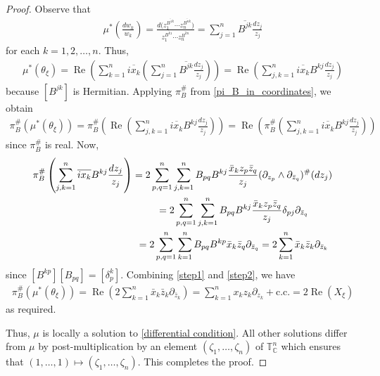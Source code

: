 \documentclass[pdftex]{sigma}
\numberwithin{equation}{section}
\begin{document}
\begin{proof}
Observe that
\begin{gather*}
\mu^*\left(\frac{dw_k}{w_k}\right)=\frac{d\big(z_1^{\overline{B^{1k}}}\cdots z_n^{\overline{B^{nk}}}\big)}{z_1^{\overline{B^{k1}}}\cdots z_n^{\overline{B^{kn}}}}=\sum_{j=1}^n \overline{B^{jk}}\frac{dz_j}{z_{j}}
\end{gather*}
for each $k=1,2,\dots,n$. Thus,
\begin{gather*}
\mu^*(\theta_\xi)=\operatorname{Re}\left(\sum_{k=1}^n \overline{ix_k}\left(\sum_{j=1}^n \overline{B^{jk}}\frac{dz_j}{z_{j}}\right)\right)=\operatorname{Re}\left(\sum_{j,k=1}^n \overline{ix_k}B^{kj}\frac{dz_j}{z_{j}}\right)
\end{gather*}
because $[B^{jk}]$ is Hermitian. Applying $\pi_B^\#$ from \eqref{pi_B_in_coordinates}, we obtain
\begin{gather}
\pi_B^\#(\mu^*(\theta_\xi)) =\pi_B^\#\left(\operatorname{Re}\left(\sum_{j,k=1}^n \overline{ix_k}B^{kj}\frac{dz_j}{z_{j}} \right)\right)
=\operatorname{Re}\left(\pi_B^\#\left(\sum_{j,k=1}^n \overline{ix_k}B^{kj}\frac{dz_j}{z_{j}}\right)\right) \label{step1}
\end{gather}
since $\pi_B^\#$ is real. Now,
\begin{gather}
\pi_B^\#\left(\sum_{j,k=1}^n \overline{ix_k}B^{kj}\frac{dz_j}{z_{j}}\right)=2\sum_{p,q=1}^n \sum_{j,k=1}^n B_{pq}B^{kj}\frac{\bar{x}_k z_p \bar{z}_q}{z_j} (\partial_{z_p}\wedge \partial_{\bar{z}_q})^\#(dz_j) \nonumber \\
\hphantom{\pi_B^\#\left(\sum_{j,k=1}^n \overline{ix_k}B^{kj}\frac{dz_j}{z_{j}}\right)}{}
=2\sum_{p,q=1}^n \sum_{j,k=1}^n B_{pq}B^{kj}\frac{\bar{x}_k z_p \bar{z}_q}{z_j} \delta_{pj}\partial_{\bar{z}_q} \nonumber \\
\hphantom{\pi_B^\#\left(\sum_{j,k=1}^n \overline{ix_k}B^{kj}\frac{dz_j}{z_{j}}\right)}{}
=2\sum_{p,q=1}^n \sum_{k=1}^n B_{pq}B^{k p}\bar{x}_k\bar{z}_q\partial_{\bar{z}_q} =2\sum_{k=1}^n\bar{x}_k\bar{z}_k\partial_{\bar{z}_k} \label{step2}
\end{gather}
since $[B^{kp}][B_{pq}]=[\delta_p^k]$. Combining \eqref{step1} and \eqref{step2}, we have
\begin{gather*}
\pi_B^\#(\mu^*(\theta_\xi)) =\operatorname{Re}\left(2\sum_{k=1}^n\bar{x}_k\bar{z}_k\partial_{\bar{z}_k}\right)=\sum_{k=1}^n x_k z_k\partial_{z_k} +\text{c.c.} = 2\operatorname{Re} (X_\xi)
\end{gather*}
as required.

Thus, $\mu$ is locally a solution to \eqref{differential condition}. All other solutions dif\/fer from $\mu$ by post-multiplication by an element $(\zeta_1,\dots,\zeta_n)$ of ${\mathbb T}_{\mathbb C}^n$ which ensures that $(1,\dots,1)\mapsto (\zeta_1,\dots,\zeta_n)$. This completes the proof.
\end{proof}
\end{document}
